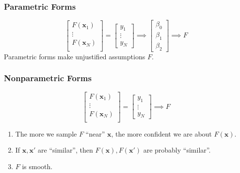 \documentclass{beamer}
\begin{document}
\begin{frame}
    \frametitle{Parametric Forms}
    \begin{equation*}
        \begin{bmatrix}
            F(\mathbf{x}_1) \\
            \vdots \\
            F(\mathbf{x}_N) \\
        \end{bmatrix}
        =
        \begin{bmatrix}
            y_1 \\
            \vdots \\
            y_N
        \end{bmatrix}
        \implies
        \begin{bmatrix}
            \beta_0 \\
            \beta_1 \\
            \beta_2
        \end{bmatrix}
        \implies F
    \end{equation*}
    \pause
    Parametric forms make unjustified assumptions $F$.
\end{frame}

\begin{frame}
    \frametitle{Nonparametric Forms}
    \begin{equation*}
        \begin{bmatrix}
            F(\mathbf{x}_1) \\
            \vdots \\
            F(\mathbf{x}_N) \\
        \end{bmatrix}
        =
        \begin{bmatrix}
            y_1 \\
            \vdots \\
            y_N
        \end{bmatrix}
        \implies F
    \end{equation*}
    \pause
    \begin{enumerate}
        \item The more we sample $F$ ``near'' $\mathbf{x}$, the more confident we are about $F(\mathbf{x})$.
            \pause
        \item If $\mathbf{x}, \mathbf{x}'$ are ``similar'', then $F(\mathbf{x}), F(\mathbf{x}')$ are probably ``similar''.
            \pause
        \item $F$ is smooth.
    \end{enumerate}
\end{frame}
\end{document}
